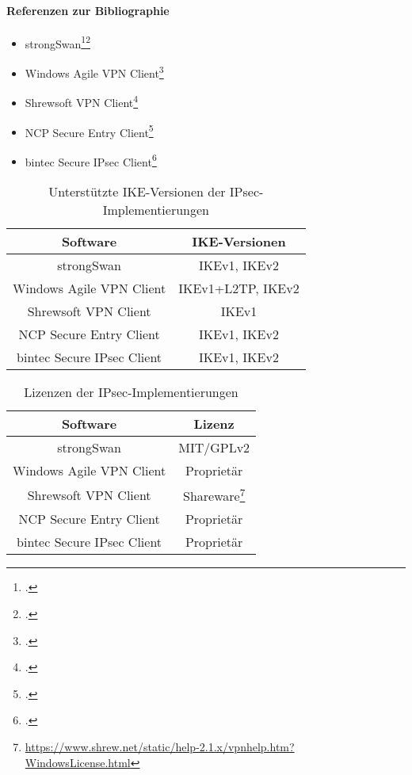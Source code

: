 \paragraph{Referenzen zur Bibliographie}
\begin{itemize}
\item strongSwan\footcite[][]{_ikev1ciphersuites_2016}\footcite[][]{_ikev2ciphersuites_2016}
\item Windows Agile VPN Client\footcite[][]{_windows7_2016}
\item Shrewsoft VPN Client\footcite[][]{_shrew_2013}
\item NCP Secure Entry Client\footcite[][]{jurgen_honig_datenblatt_2016}
\item bintec Secure IPsec Client\footcite[][]{_bintec_2016-1}
\end{itemize}


\begin{table}[h]
\begin{tabular*}{\textwidth}{|c|c|}\firsthline
Software & IKE-Versionen \\ \hline
strongSwan & IKEv1, IKEv2\\ \hline
Windows Agile VPN Client & IKEv1+L2TP, IKEv2 \\ \hline
Shrewsoft VPN Client & IKEv1 \\ \hline
NCP Secure Entry Client & IKEv1, IKEv2 \\ \hline
bintec Secure IPsec Client & IKEv1, IKEv2 \\ \hline
\end{tabular*}
\label{tab:IPsec-Implementierungen-IKE-Versionen}
\caption{Unterstützte IKE-Versionen der IPsec-Implementierungen}
\end{table}


\begin{table}[h]
\begin{tabular*}{\textwidth}{|c|c|}\firsthline
Software & Lizenz \\ \hline
strongSwan & MIT/GPLv2 \\ \hline
Windows Agile VPN Client & Proprietär \\ \hline
Shrewsoft VPN Client & Shareware\footnote{\url{https://www.shrew.net/static/help-2.1.x/vpnhelp.htm?WindowsLicense.html}} \\ \hline
NCP Secure Entry Client & Proprietär \\ \hline
bintec Secure IPsec Client & Proprietär \\ \hline
\end{tabular*}
\label{tab:IPsec-Implementierungen-Lizenzen}
\caption{Lizenzen der IPsec-Implementierungen}
\end{table}

